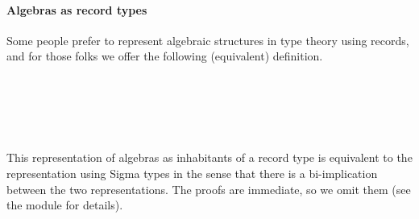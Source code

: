 \paragraph*{Algebras as record types} %

Some people prefer to represent algebraic structures in type theory using records, and for those folks we offer the following (equivalent) definition.
\ccpad
\begin{code}%
\>[0]\AgdaSpace{}%
\AgdaSpace{}%
\AgdaSymbol{(}\AgdaSpace{}%
\AgdaSymbol{:}\AgdaSpace{}%
\AgdaSymbol{)}\AgdaSpace{}%
\AgdaSymbol{(}\AgdaSpace{}%
\AgdaSymbol{:}\AgdaSpace{}%
\AgdaSpace{}%
\AgdaSpace{}%
\AgdaSymbol{)}\AgdaSpace{}%
\AgdaSymbol{:}\AgdaSpace{}%
\AgdaSymbol{(}\AgdaSpace{}%
\AgdaSpace{}%
\AgdaSpace{}%
\AgdaSpace{}%
\AgdaSymbol{)}\AgdaSpace{}%
\AgdaSpace{}%
\AgdaSpace{}%
\<%
\\
\>[0][@{}l@{\AgdaIndent{0}}]%
\>[1]\AgdaSpace{}%
\<%
\\
%
\>[1]\<%
\\
\>[1][@{}l@{\AgdaIndent{0}}]%
\>[2]\AgdaSpace{}%
\AgdaSymbol{:}\AgdaSpace{}%
\AgdaSpace{}%
\<%
\\
%
\>[2]\AgdaSpace{}%
\AgdaSymbol{:}\AgdaSpace{}%
\AgdaSymbol{(}\AgdaSpace{}%
\AgdaSymbol{:}\AgdaSpace{}%
\AgdaSpace{}%
\AgdaSpace{}%
\AgdaSymbol{)}\AgdaSpace{}%
\AgdaSpace{}%
\AgdaSymbol{((}\AgdaSpace{}%
\AgdaSpace{}%
\AgdaSpace{}%
\AgdaSymbol{)}\AgdaSpace{}%
\AgdaSpace{}%
\AgdaSymbol{)}\AgdaSpace{}%
\AgdaSpace{}%
\<%
\end{code}
\ccpad
This representation of algebras as inhabitants of a record type is equivalent to the representation using Sigma types in the sense that there is a bi-implication between the two representations. The proofs are immediate, so we omit them (see the  module for details).
